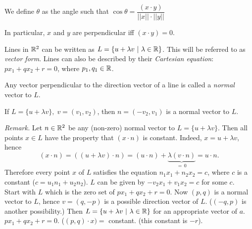 \documentclass[10pt]{scrartcl}
\begin{document}
\begin{definition}
	We define $\theta$ as the angle such that $\cos\theta = \dfrac{(x\cdot y)}{||x|| \cdot||y||}$
\end{definition}

\begin{center}
\end{center}

In particular, $x$ and $y$ are perpendicular iff $(x\cdot y) = 0$. 

Lines in $\mathbb{R}^2$ can be written as $L =\{u + \lambda v ~|~ \lambda \in\mathbb{R}\}$. This will be referred to as \emph{vector form}. Lines can also be described by their \emph{Cartesian equation}: $px_1 + qx_2 + r = 0$, where $p_1,q_1 \in\mathbb{R}$.\\

\begin{definition}
Any vector perpendicular to the direction vector of a line is called a \emph{normal} vector to $L$. 
\end{definition}


\begin{center}
\end{center}



If $L = \{u +\lambda v\},\; v = (v_1,v_2)$, then $n = (-v_2,v_1)$ is a normal vector to $L$. 

\emph{Remark.} Let $n\in\mathbb{R}^2$ be any (non-zero) normal vector to $L= \{u + \lambda v\}$. Then all points $x \in L$ have the property that $(x\cdot n)$ is constant. Indeed, $x = u + \lambda v$, hence 
\[
  (x\cdot n) = ((u +\lambda v)\cdot n) = (u\cdot n) + \underbrace{\lambda(v\cdot n)}_{=\,0} = u \cdot n.
\]
Therefore every point $x$ of $L$ satisfies the equation $n_1x_1 + n_2x_2 = c$, where $c$ is a constant ($c = u_1n_1 + u_2n_2$). $L$ can be given by $-v_2x_1 + v_1x_2 = c$ for some $c$. \\


Start with $L$ which is the zero set of $px_1 + qx_2 + r = 0$. Now $(p,q)$ is a normal vector to $L$, hence $v = (q,-p)$ is a possible direction vector of $L$. ($(-q,p)$ is another possibility.) Then $L = \{u + \lambda v~|~ \lambda\in\mathbb{R}\}$ for an appropriate vector of $a$. $px_1 + qx_2 + r = 0$. ($(p,q)\cdot x)=$ constant. (this constant is $-r$). 
\end{document}
